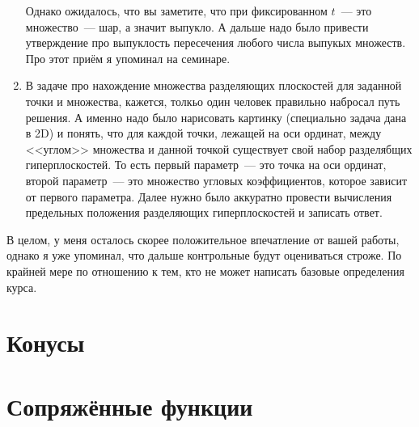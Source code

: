 \documentclass[12pt]{article}
\begin{document}
\begin{enumerate}
Однако ожидалось, что вы заметите, что при фиксированном $t$~---  это множество~--- шар, а значит выпукло.
А дальше надо было привести утверждение про выпуклость пересечения любого числа выпукых множеств.
Про этот приём я упоминал на семинаре.
\item В задаче про нахождение множества разделяющих плоскостей для заданной точки и множества, кажется, толкьо один человек правильно набросал путь решения. 
А именно надо было нарисовать картинку (специально задача дана в 2D) и понять, что для каждой точки, лежащей на оси ординат, между <<углом>> множества и данной точкой существует свой набор разделябщих гиперплоскостей.
То есть первый параметр~--- это точка на оси ординат, второй параметр~--- это множество угловых коэффициентов, которое зависит от первого параметра.
Далее нужно было аккуратно провести вычисления предельных положения разделяющих гиперплоскостей и записать ответ.   
\end{enumerate}

В целом, у меня осталось скорее положительное впечатление от вашей работы, однако я уже упоминал, что дальше контрольные будут оцениваться строже.
По крайней мере по отношению к тем, кто не может написать базовые определения курса.

\section{Конусы}

\section{Сопряжённые функции}
\end{document}
